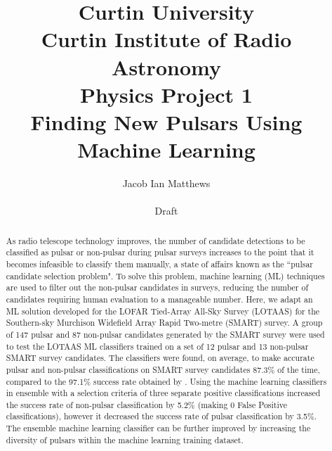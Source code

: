 \documentclass{article}
\title{\large{Curtin University} \\ \large{Curtin Institute of Radio Astronomy} \\ \large{Physics Project 1} \\ \vspace*{20px} \textbf{\LARGE{Finding New Pulsars Using Machine Learning}}\vspace*{10px}}
\author{\vspace*{20px} Jacob Ian Matthews \\ \\ Draft}
\begin{document}
\begin{titlepage}
    
    \maketitle
    \thispagestyle{empty}
    
    \vspace*{20px}

    \begin{abstract}

        As radio telescope technology improves, the number of candidate detections to be classified as pulsar or non-pulsar during pulsar surveys increases to the point that it becomes infeasible to classify them manually, a state of affairs known as the ``pulsar candidate selection problem". To solve this problem, machine learning (ML) techniques are used to filter out the non-pulsar candidates in surveys, reducing the number of candidates requiring human evaluation to a manageable number. Here, we adapt an ML solution developed for the LOFAR Tied-Array All-Sky Survey (LOTAAS) for the Southern-sky Murchison Widefield Array Rapid Two-metre (SMART) survey. A group of 147 pulsar and 87 non-pulsar candidates generated by the SMART survey were used to test the LOTAAS ML classifiers trained on a set of 12 pulsar and 13 non-pulsar SMART survey candidates. The classifiers were found, on average, to make accurate pulsar and non-pulsar classifications on SMART survey candidates 87.3\% of the time, compared to the 97.1\% success rate obtained by \textcite{lyon}. Using the machine learning classifiers in ensemble with a selection criteria of three separate positive classifications increased the success rate of non-pulsar classification by 5.2\% (making 0 False Positive classifications), however it decreased the success rate of pulsar classification by 3.5\%. The ensemble machine learning classifier can be further improved by increasing the diversity of pulsars within the machine learning training dataset.

    \end{abstract}



\end{titlepage}

\pagebreak

\tableofcontents

\pagebreak

\end{document}
